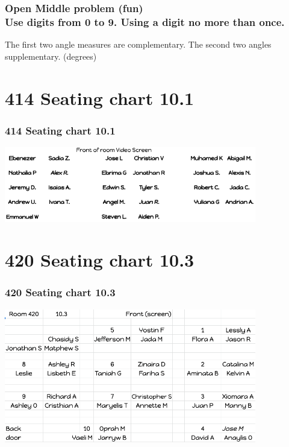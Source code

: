 \documentclass{beamer}
\begin{document}
  \frame
  {
    \frametitle{Open Middle problem (fun) \\
    Use digits from 0 to 9. Using a digit no more than once.}
      The first two angle measures are complementary. The second two angles supplementary. (degrees)\\[0.75cm]
         \vspace{5cm} 
  }

  \section{414 Seating chart 10.1}
  \frame
  {
    \frametitle{414 Seating chart 10.1}
    \includegraphics[width=11cm]{Seating_10A-414.png}
  }

  \section{420 Seating chart 10.3}
  \frame
  {
    \frametitle{420 Seating chart 10.3}
    \begin{center}
      \includegraphics[width=11cm]{10C_seating.png}
    \end{center}
  }
\end{document}
